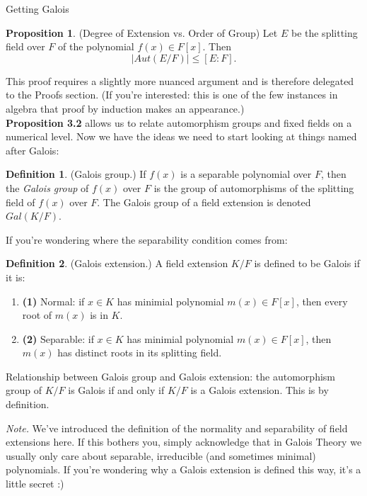 \documentclass[12pt]{article}
\theoremstyle{definition}
\theoremstyle{definition}
\newtheorem{definition}{Definition}[section]
\theoremstyle{definition}
\theoremstyle{definition}
\theoremstyle{definition}
\theoremstyle{definition}
\newtheorem{proposition}{Proposition}[section]
\theoremstyle{definition}
\begin{document}
\begin{section}{Getting Galois}
    \begin{proposition}{(Degree of Extension vs. Order of Group)}
        Let \(E\) be the splitting field over \(F\) of the polynomial \(f(x) \in F[x]\). Then 
        \[\left|Aut(E/F)\right| \leq [E:F].\]
    \end{proposition}
    This proof requires a slightly more nuanced argument and is therefore delegated to the Proofs section. (If you're interested: this is one of the few instances 
    in algebra that proof by induction makes an appearance.)\\
    \break
    \textbf{Proposition 3.2} allows us to relate automorphism groups and fixed fields on a numerical level. Now we have the ideas we need to start looking at things
    named after Galois:

    \begin{definition}{(Galois group.)}
        If \(f(x)\) is a separable polynomial over \(F\), then the \textit{Galois group} of \(f(x)\) over \(F\)
        is the group of automorphisms of the splitting field of \(f(x)\) over \(F\). The Galois group of a field extension is denoted 
        \(Gal(K/F)\).
    \end{definition}

    If you're wondering where the separability condition comes from:

    \begin{definition}{(Galois extension.)}
        A field extension \(K/F\) is defined to be Galois if it is:
        \begin{enumerate}
            \item \textbf{(1)} Normal: if \(x\in K\) has minimial polynomial \(m(x) \in F[x]\), then every root of \(m(x)\) is in \(K\).
            \item \textbf{(2)} Separable: if \(x\in K\) has minimial polynomial \(m(x) \in F[x]\), then \(m(x)\) has distinct roots in its splitting field.
        \end{enumerate}
        Relationship between Galois group and Galois extension: the automorphism group of \(K/F\) is Galois if and only if \(K/F\) is a Galois extension. This 
        is by definition.
    \end{definition}

    \textit{Note.} We've introduced the definition of the normality and separability of field extensions here. If this bothers you, simply acknowledge that in 
    Galois Theory we usually only care about separable, irreducible (and sometimes minimal) polynomials. If you're wondering why a Galois extension is defined this way,
    it's a little secret :)\\


\end{section}
\end{document}
